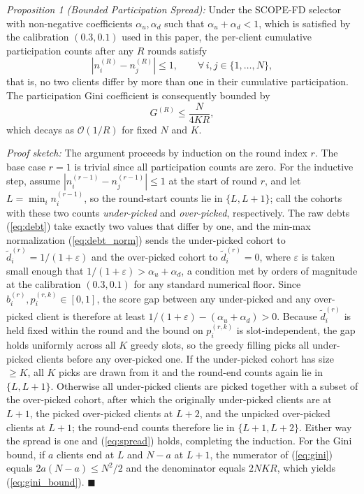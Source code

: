 \documentclass[journal]{IEEEtran}
\newcommand{\revIVE}[1]{#1}
\begin{document}
\textit{Proposition 1 (Bounded Participation Spread):} Under the SCOPE-FD selector with non-negative coefficients $\alpha_u, \alpha_d$ such that $\alpha_u + \alpha_d < 1$, which is satisfied by the calibration $(0.3, 0.1)$ used in this paper, the per-client cumulative participation counts after any $R$ rounds satisfy
\begin{equation}
\left| n_i^{(R)} - n_j^{(R)} \right| \le 1, \qquad \forall\, i,j \in \{1,\dots,N\},
\label{eq:spread}
\end{equation}
that is, no two clients differ by more than one in their cumulative participation. The participation Gini coefficient is consequently bounded by
\begin{equation}
G^{(R)} \le \frac{N}{4KR},
\label{eq:gini_bound}
\end{equation}
which decays as $\mathcal{O}(1/R)$ for fixed $N$ and $K$.

\textit{Proof sketch:} The argument proceeds by induction on the round index $r$. The base case $r = 1$ is trivial since all participation counts are zero. For the inductive step, assume $|n_i^{(r-1)} - n_j^{(r-1)}| \le 1$ at the start of round $r$, and let $L = \min_i n_i^{(r-1)}$, so the round-start counts lie in $\{L, L+1\}$; call the cohorts with these two counts \emph{under-picked} and \emph{over-picked}, respectively. The raw debts (\ref{eq:debt}) take exactly two values that differ by one, and the min-max normalization (\ref{eq:debt_norm}) sends the under-picked cohort to $\tilde{d}_i^{(r)} = 1/(1+\varepsilon)$ and the over-picked cohort to $\tilde{d}_i^{(r)} = 0$, \revIVE{where $\varepsilon$ is taken small enough that $1/(1+\varepsilon) > \alpha_u + \alpha_d$, a condition met by orders of magnitude at the calibration $(0.3, 0.1)$ for any standard numerical floor.} Since $b_i^{(r)}, p_i^{(r,k)} \in [0,1]$, the score gap between any under-picked and any over-picked client is therefore at least $1/(1+\varepsilon) - (\alpha_u + \alpha_d) > 0$. \revIVE{Because $\tilde{d}_i^{(r)}$ is held fixed within the round and the bound on $p_i^{(r,k)}$ is slot-independent, the gap holds uniformly across all $K$ greedy slots,} so the greedy filling picks all under-picked clients before any over-picked one. If the under-picked cohort has size $\ge K$, all $K$ picks are drawn from it and the round-end counts again lie in $\{L, L+1\}$. Otherwise all under-picked clients are picked together with a subset of the over-picked cohort, after which the originally under-picked clients are at $L+1$, the picked over-picked clients at $L+2$, and the unpicked over-picked clients at $L+1$; the round-end counts therefore lie in $\{L+1, L+2\}$. Either way the spread is one and (\ref{eq:spread}) holds, completing the induction. For the Gini bound, if $a$ clients end at $L$ and $N-a$ at $L+1$, the numerator of (\ref{eq:gini}) equals $2a(N-a) \le N^2/2$ and the denominator equals $2NKR$, which yields (\ref{eq:gini_bound}). \hfill$\blacksquare$
\end{document}

